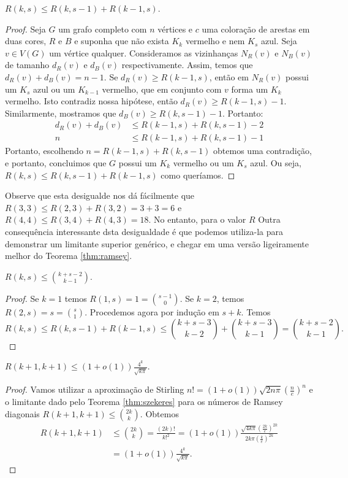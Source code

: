 \begin{theorem}
\label{thm:inequality}
$R(k,s) \leq R(k,s-1) + R(k-1,s)$.
\end{theorem}
\begin{proof}
Seja $G$ um grafo completo com $n$ vértices e $c$ uma coloração de arestas em duas cores, $R$ e $B$ e suponha que não exista $K_k$ vermelho e nem $K_s$ azul. Seja $v \in V(G)$ um vértice qualquer. Consideramos as vizinhanças $N_R(v)$ e $N_B(v)$ de tamanho $d_R(v)$ e $d_B(v)$ respectivamente. Assim, temos que $d_R(v) + d_B(v) = n-1$. Se $d_R(v) \geq R(k-1,s)$, então em $N_R(v)$ possui um $K_s$ azul ou um $K_{k-1}$ vermelho, que em conjunto com $v$ forma um $K_k$ vermelho. Isto contradiz nossa hipótese, então $d_R(v) \geq R(k-1,s) - 1$. Similarmente, mostramos que $d_B(v) \geq R(k,s-1) - 1$. Portanto:
\begin{align*}
d_R(v) + d_B(v) &\leq R(k-1,s) + R(k,s-1) - 2 \\
n &\leq R(k-1,s) + R(k,s-1) - 1
\end{align*}
Portanto, escolhendo $n = R(k-1,s) + R(k,s-1)$ obtemos uma contradição, e portanto, concluimos que $G$ possui um $K_k$ vermelho ou um $K_s$ azul. Ou seja, $R(k,s) \leq R(k,s-1) + R(k-1,s)$ como queríamos.
\end{proof}

Observe que esta desigualde nos dá fácilmente que $R(3,3) \leq R(2,3) + R(3,2) = 3 + 3 = 6$ e $R(4,4) \leq R(3,4) + R(4,3) = 18$. No entanto, para o valor $R$ Outra consequência interessante dsta desigualdade é que podemos utiliza-la para demonstrar um limitante superior genérico, e chegar em uma versão ligeiramente melhor do Teorema \ref{thm:ramsey}.


\begin{theorem}
\label{thm:szekeres}
$\displaystyle R(k,s) \leq \binom{k + s - 2}{k - 1}$.
\end{theorem}
\begin{proof}
Se $k = 1$ temos $R(1,s) = 1 = \binom{s - 1}{0}$. Se $k = 2$, temos $R(2,s) = s = \binom{s}{1}$. Procedemos agora por indução em $s + k$. Temos
\[ R(k,s) \leq R(k,s-1) + R(k-1,s) \leq \binom{k + s - 3}{k - 2} + \binom{k + s - 3}{k - 1} = \binom{k + s - 2}{k - 1}. \]
\end{proof}

\begin{corollary}
\label{col:szekeres}
$\displaystyle R(k+1,k+1) \leq (1+o(1))\frac{4^k}{\sqrt{k \pi}}$.
\end{corollary}
\begin{proof}
Vamos utilizar a aproximação de Stirling $n! = (1+o(1)) \sqrt{2n \pi} \left ( \frac{n}{e} \right)^n $ e o limitante dado pelo Teorema \ref{thm:szekeres} para os números de Ramsey diagonais $R(k+1,k+1) \leq \binom{2k}{k}$. Obtemos
\begin{align*}
R(k+1,k+1) &\leq \binom{2k}{k} = \frac{(2k)!}{k!^2} = (1 +o(1)) \frac{\sqrt{4 k \pi} \left ( \frac{2k}{e} \right)^{2k} }{2k\pi \left ( \frac{k}{e} \right)^{2k} } \\
&= (1 +o(1))\frac{4^k}{\sqrt{k\pi}}.
\end{align*}
\end{proof}

